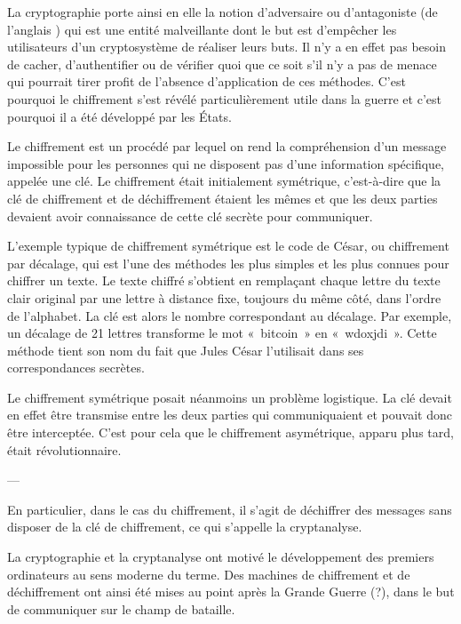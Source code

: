
La cryptographie porte ainsi en elle la notion d'adversaire ou d'antagoniste (de l'anglais ) qui est une entité malveillante dont le but est d'empêcher les utilisateurs d'un cryptosystème de réaliser leurs buts. Il n'y a en effet pas besoin de cacher, d'authentifier ou de vérifier quoi que ce soit s'il n'y a pas de menace qui pourrait tirer profit de l'absence d'application de ces méthodes. C'est pourquoi le chiffrement s'est révélé particulièrement utile dans la guerre et c'est pourquoi il a été développé par les États.

Le chiffrement est un procédé par lequel on rend la compréhension d'un message impossible pour les personnes qui ne disposent pas d'une information spécifique, appelée une clé. Le chiffrement était initialement symétrique, c'est-à-dire que la clé de chiffrement et de déchiffrement étaient les mêmes et que les deux parties devaient avoir connaissance de cette clé secrète pour communiquer.

L'exemple typique de chiffrement symétrique est le code de César, ou chiffrement par décalage, qui est l'une des méthodes les plus simples et les plus connues pour chiffrer un texte. Le texte chiffré s'obtient en remplaçant chaque lettre du texte clair original par une lettre à distance fixe, toujours du même côté, dans l'ordre de l'alphabet. La clé est alors le nombre correspondant au décalage. Par exemple, un décalage de 21 lettres transforme le mot «~bitcoin~» en «~wdoxjdi~». Cette méthode tient son nom du fait que Jules César l'utilisait dans ses correspondances secrètes.

Le chiffrement symétrique posait néanmoins un problème logistique. La clé devait en effet être transmise entre les deux parties qui communiquaient et pouvait donc être interceptée. C'est pour cela que le chiffrement asymétrique, apparu plus tard, était révolutionnaire.

---





En particulier, dans le cas du chiffrement, il s'agit de déchiffrer des messages sans disposer de la clé de chiffrement, ce qui s'appelle la cryptanalyse.

La cryptographie et la cryptanalyse ont motivé le développement des premiers ordinateurs au sens moderne du terme. Des machines de chiffrement et de déchiffrement ont ainsi été mises au point après la Grande Guerre (?), dans le but de communiquer sur le champ de bataille.


